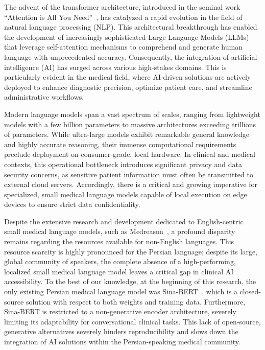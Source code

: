 \documentclass[review]{elsarticle}
\begin{document}
The advent of the transformer architecture, introduced in the seminal work ``Attention is All You Need''~\cite{b3}, has catalyzed a rapid evolution in the field of natural language processing (NLP). This architectural breakthrough has enabled the development of increasingly sophisticated Large Language Models (LLMs) that leverage self-attention mechanisms to comprehend and generate human language with unprecedented accuracy. Consequently, the integration of artificial intelligence (AI) has surged across various high-stakes domains. This is particularly evident in the medical field, where AI-driven solutions are actively deployed to enhance diagnostic precision, optimize patient care, and streamline administrative workflows.

Modern language models span a vast spectrum of scales, ranging from lightweight models with a few billion parameters to massive architectures exceeding trillions of parameters. While ultra-large models exhibit remarkable general knowledge and highly accurate reasoning, their immense computational requirements preclude deployment on consumer-grade, local hardware. In clinical and medical contexts, this operational bottleneck introduces significant privacy and data security concerns, as sensitive patient information must often be transmitted to external cloud servers. Accordingly, there is a critical and growing imperative for specialized, small medical language models capable of local execution on edge devices to ensure strict data confidentiality.

Despite the extensive research and development dedicated to English-centric small medical language models, such as Medreason~\cite{b4}, a profound disparity remains regarding the resources available for non-English languages. This resource scarcity is highly pronounced for the Persian language; despite its large, global community of speakers, the complete absence of a high-performing, localized small medical language model leaves a critical gap in clinical AI accessibility. To the best of our knowledge, at the beginning of this research, the only existing Persian medical language model was Sina-BERT~\cite{b5}, which is a closed-source solution with respect to both weights and training data. Furthermore, Sina-BERT is restricted to a non-generative encoder architecture, severely limiting its adaptability for conversational clinical tasks. This lack of open-source, generative alternatives severely hinders reproducibility and slows down the integration of AI solutions within the Persian-speaking medical community.
\end{document}
